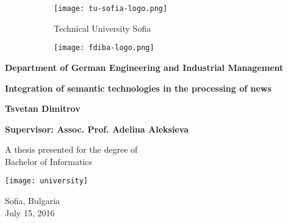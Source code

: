
    \begin{figure}  
        \begin{subfigure}[b]{0.3\textwidth}
            \texttt{[image: tu-sofia-logo.png]}
        \end{subfigure}
        \begin{subfigure}[b]{0.36\textwidth}
            \centering
            \Large{Technical University Sofia}
        \end{subfigure}
        \begin{subfigure}[b]{0.3\textwidth}
            \texttt{[image: fdiba-logo.png]}
        \end{subfigure}
    \end{figure}
    \begin{center}
        \textbf{\large{Department of German Engineering and Industrial Management}}
        
        \vspace*{4cm}
        
        \textbf{\Huge{Integration of semantic technologies in the processing of news}}
    
        \vspace{1.5cm}

        \textbf{\large{Tsvetan Dimitrov}}
        
        \vspace{1.5cm}
        
        \textbf{\large{Supervisor: Assoc. Prof. Adelina Aleksieva}}

        
        \vfill
        
        A thesis presented for the degree of\\
        Bachelor of Informatics
        
        \vspace{0.8cm}
        
        \texttt{[image: university]}
    
        Sofia, Bulgaria\\
        July 15, 2016
    \end{center}


